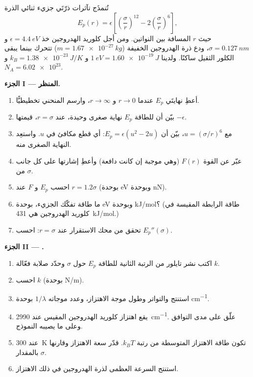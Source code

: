 \begin{problem}
\label{pb:b1:work-and-energy:1}
تُنمذَج تآثرات ذرّتَي جزيء ثنائي الذرة 
\[
E_p(r) = \epsilon\left[\left(\frac{\sigma}{r}\right)^{12} - 2\left(\frac{\sigma}{r}\right)^{6}\right],
\]
حيث $r$ المسافة بين النواتين. ومن أجل كلوريد الهدروجين خذ
$\epsilon = \qty{4.4}{eV}$ و $\sigma = \qty{0.127}{nm}$، ودع ذرة الهدروجين
الخفيفة ($m = \qty{1.67e-27}{kg}$) تتحرك بينما يبقى الكلور الثقيل
ساكنًا. ولدينا $\qty{1}{eV} = \qty{1.60e-19}{J}$ و $k_B = \qty{1.38e-23}{J/K}$ و
$N_A = \num{6.02e23}$.

\medskip
\noindent\textbf{الجزء I --- المنظر.}
\begin{enumerate}
  \item أعطِ نهايتَي $E_p$ عندما $r \to 0$ و $r \to \infty$، وارسم
        المنحني تخطيطيًّا.
  \item بيّن أن للطاقة $E_p$ نهاية صغرى وحيدة، عند $r = \sigma$، قيمتها
        $-\epsilon$.
  \item مع $u = (\sigma/r)^6$، بيّن أن $E_p = \epsilon(u^2 - 2u)$: أي
        قطع مكافئ في $u$. واستعِد النهاية الصغرى منه.
  \item عبّر عن القوة $F(r)$ (وهي موجبة إن كانت دافعة) وأعطِ
        إشارتها على كل جانب من $\sigma$.
  \item احسب $E_p$ و $F$ عند $r = 1.2\sigma$ (بوحدة \unit{eV} وبوحدة \unit{nN}).
  \item ما طاقة تفكّك الجزيء، بوحدة \unit{eV} وبوحدة
        \unit{kJ/mol}؟ (طاقة الرابطة المقيسة في كلوريد الهدروجين هي \qty{431}{kJ/mol}.)
  \item تحقق من محك الاستقرار عند $r = \sigma$: احسب
        $E_p''(\sigma)$.
\end{enumerate}

\medskip
\noindent\textbf{الجزء II --- .}
\begin{enumerate}[resume]
  \item اكتب نشر تايلور من الرتبة الثانية للطاقة $E_p$ حول $\sigma$
        وحدّد صلابة فعّالة $k$.
  \item احسب $k$ (بوحدة \unit{N/m}).
  \item استنتج  والتواتر وطول موجة
        الاهتزاز، وعدد موجاته $1/\lambda$ بوحدة \unit{cm^{-1}}.
  \item يقع اهتزاز كلوريد الهدروجين المقيس عند \qty{2990}{cm^{-1}}. علّق
        على مدى التوافق وعلى ما يصيبه النموذج.
  \item عند \qty{300}{K} تكون طاقة الاهتزاز المتوسطة من رتبة $k_BT$.
        قدّر سعة الاهتزاز وقارنها بالمقدار $\sigma$.
  \item استنتج السرعة العظمى لذرة الهدروجين في ذلك
        الاهتزاز.
\end{enumerate}


\end{problem}
